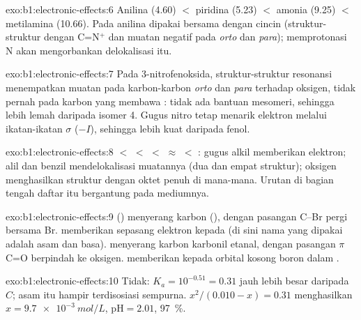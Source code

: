 \begin{solution}{exo:b1:electronic-effects:6}
Anilina (4.60) $<$ piridina (5.23) $<$ amonia (9.25) $<$ metilamina
(10.66). Pada anilina  dipakai bersama dengan
cincin (struktur-struktur dengan C=N$^+$ dan muatan negatif pada
\textit{orto} dan \textit{para}); memprotonasi N akan mengorbankan
delokalisasi itu.
\end{solution}

\begin{solution}{exo:b1:electronic-effects:7}
Pada 3-nitrofenoksida, struktur-struktur resonansi menempatkan muatan pada
karbon-karbon \textit{orto} dan \textit{para} terhadap oksigen, tidak
pernah pada karbon yang membawa : tidak ada bantuan mesomeri,
sehingga lebih lemah daripada isomer 4. Gugus nitro tetap menarik
elektron melalui ikatan-ikatan $\sigma$ ($-I$), sehingga lebih kuat
daripada fenol.
\end{solution}

\begin{solution}{exo:b1:electronic-effects:8}
 $<$  $<$  $<$ 
$\approx$  $<$ : gugus alkil memberikan
elektron; alil dan benzil mendelokalisasi muatannya (dua dan empat
struktur);  oksigen menghasilkan struktur dengan
oktet penuh di mana-mana. Urutan di bagian tengah daftar itu bergantung
pada mediumnya.
\end{solution}

\begin{solution}{exo:b1:electronic-effects:9}
 () menyerang karbon  (), dengan
pasangan C--Br pergi bersama Br.  memberikan sepasang elektron
kepada  (di sini nama yang dipakai adalah asam dan basa).
 menyerang karbon karbonil etanal, dengan pasangan $\pi$ C=O
berpindah ke oksigen.  memberikan 
kepada orbital kosong boron dalam .
\end{solution}

\begin{solution}{exo:b1:electronic-effects:10}
Tidak: $K_a = 10^{-0.51} = 0.31$ jauh lebih besar daripada $C$; asam itu
hampir terdisosiasi sempurna. $x^2/(0.010 - x) = 0.31$ menghasilkan
$x = \qty{9.7e-3}{mol/L}$, $\mathrm{pH} = 2.01$, 
\qty{97}{\percent}.
\end{solution}

